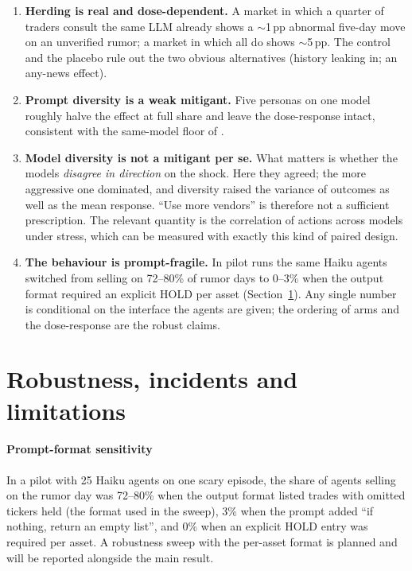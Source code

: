 \documentclass[10pt]{article}
\begin{document}
\begin{enumerate}
  \item \textbf{Herding is real and dose-dependent.} A market in which a quarter of traders consult the same LLM already shows a $\sim$1\,pp abnormal five-day move on an unverified rumor; a market in which all do shows $\sim$5\,pp. The control and the placebo rule out the two obvious alternatives (history leaking in; an any-news effect).
  \item \textbf{Prompt diversity is a weak mitigant.} Five personas on one model roughly halve the effect at full share and leave the dose-response intact, consistent with the same-model floor of \citet{ross2026}.
  \item \textbf{Model diversity is not a mitigant per se.} What matters is whether the models \emph{disagree in direction} on the shock. Here they agreed; the more aggressive one dominated, and diversity raised the variance of outcomes as well as the mean response. ``Use more vendors'' is therefore not a sufficient prescription. The relevant quantity is the correlation of actions across models under stress, which can be measured with exactly this kind of paired design.
  \item \textbf{The behaviour is prompt-fragile.} In pilot runs the same Haiku agents switched from selling on 72--80\% of rumor days to 0--3\% when the output format required an explicit HOLD per asset (Section~\ref{sec:robust}). Any single number is conditional on the interface the agents are given; the ordering of arms and the dose-response are the robust claims.
\end{enumerate}

\section{Robustness, incidents and limitations}
\label{sec:robust}

\paragraph{Prompt-format sensitivity} In a pilot with 25 Haiku agents on one scary episode, the share of agents selling on the rumor day was 72--80\% when the output format listed trades with omitted tickers held (the format used in the sweep), 3\% when the prompt added ``if nothing, return an empty list'', and 0\% when an explicit HOLD entry was required per asset. A robustness sweep with the per-asset format is planned and will be reported alongside the main result.
\end{document}
